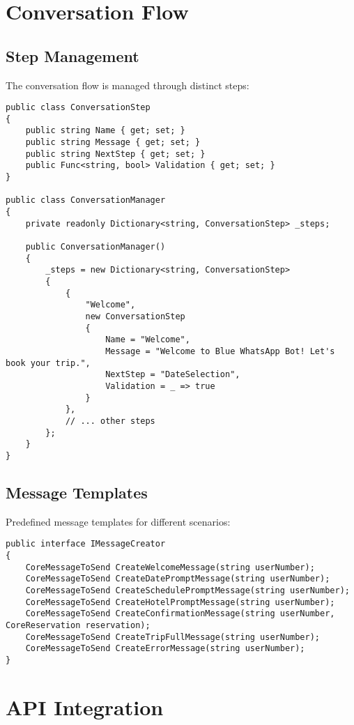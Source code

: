 \section{Conversation Flow}

\subsection{Step Management}
The conversation flow is managed through distinct steps:

\begin{lstlisting}[language=CSharp]
public class ConversationStep
{
    public string Name { get; set; }
    public string Message { get; set; }
    public string NextStep { get; set; }
    public Func<string, bool> Validation { get; set; }
}

public class ConversationManager
{
    private readonly Dictionary<string, ConversationStep> _steps;

    public ConversationManager()
    {
        _steps = new Dictionary<string, ConversationStep>
        {
            {
                "Welcome",
                new ConversationStep
                {
                    Name = "Welcome",
                    Message = "Welcome to Blue WhatsApp Bot! Let's book your trip.",
                    NextStep = "DateSelection",
                    Validation = _ => true
                }
            },
            // ... other steps
        };
    }
}
\end{lstlisting}

\subsection{Message Templates}
Predefined message templates for different scenarios:

\begin{lstlisting}[language=CSharp]
public interface IMessageCreator
{
    CoreMessageToSend CreateWelcomeMessage(string userNumber);
    CoreMessageToSend CreateDatePromptMessage(string userNumber);
    CoreMessageToSend CreateSchedulePromptMessage(string userNumber);
    CoreMessageToSend CreateHotelPromptMessage(string userNumber);
    CoreMessageToSend CreateConfirmationMessage(string userNumber, CoreReservation reservation);
    CoreMessageToSend CreateTripFullMessage(string userNumber);
    CoreMessageToSend CreateErrorMessage(string userNumber);
}
\end{lstlisting}

\section{API Integration}

